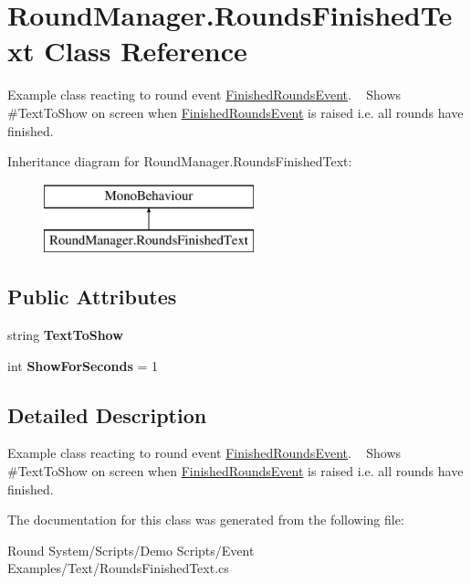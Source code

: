 \hypertarget{class_round_manager_1_1_rounds_finished_text}{}\section{Round\+Manager.\+Rounds\+Finished\+Text Class Reference}
\label{class_round_manager_1_1_rounds_finished_text}


Example class reacting to round event \hyperlink{class_round_manager_1_1_events_1_1_finished_rounds_event}{Finished\+Rounds\+Event}. ~\newline
Shows \#\+Text\+To\+Show on screen when \hyperlink{class_round_manager_1_1_events_1_1_finished_rounds_event}{Finished\+Rounds\+Event} is raised i.\+e. all rounds have finished.  


Inheritance diagram for Round\+Manager.\+Rounds\+Finished\+Text\+:\begin{figure}[H]
\begin{center}
\leavevmode
\includegraphics[height=2.000000cm]{class_round_manager_1_1_rounds_finished_text}
\end{center}
\end{figure}
\subsection*{Public Attributes}
\begin{DoxyCompactItemize}
\item 
\hypertarget{class_round_manager_1_1_rounds_finished_text_a513cef838712669fc37e2983312af1db}{}string {\bfseries Text\+To\+Show}\label{class_round_manager_1_1_rounds_finished_text_a513cef838712669fc37e2983312af1db}

\item 
\hypertarget{class_round_manager_1_1_rounds_finished_text_a558c66439bd9fbde9848e0024ab3a76b}{}int {\bfseries Show\+For\+Seconds} = 1\label{class_round_manager_1_1_rounds_finished_text_a558c66439bd9fbde9848e0024ab3a76b}

\end{DoxyCompactItemize}


\subsection{Detailed Description}
Example class reacting to round event \hyperlink{class_round_manager_1_1_events_1_1_finished_rounds_event}{Finished\+Rounds\+Event}. ~\newline
Shows \#\+Text\+To\+Show on screen when \hyperlink{class_round_manager_1_1_events_1_1_finished_rounds_event}{Finished\+Rounds\+Event} is raised i.\+e. all rounds have finished. 



The documentation for this class was generated from the following file\+:\begin{DoxyCompactItemize}
\item 
Round System/\+Scripts/\+Demo Scripts/\+Event Examples/\+Text/Rounds\+Finished\+Text.\+cs\end{DoxyCompactItemize}
